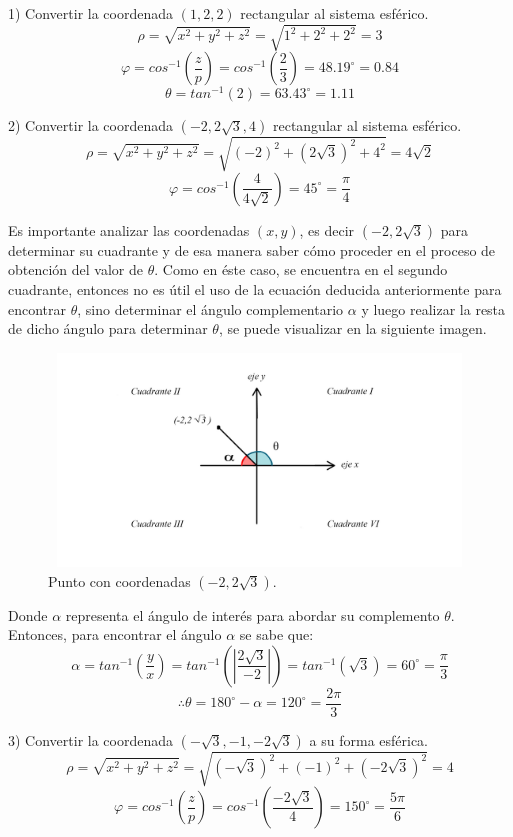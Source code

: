 1) Convertir la coordenada ${(1,2,2)}$ rectangular al sistema esférico.
\[\rho = \sqrt{x^{2}+y^{2}+z^{2}} = \sqrt{1^{2}+2^{2}+2^{2}} = 3\]
\[\varphi = cos^{-1}\left(\frac{z}{p}\right) = cos^{-1}\left(\frac{2}{3}\right) = 48.19^{\circ} = 0.84\]
\[\theta = tan^{-1}(2) = 63.43^{\circ} = 1.11\]

\vspace{4mm}
2) Convertir la coordenada ${(-2,2\sqrt{3},4)}$ rectangular al sistema esférico.
\[\rho = \sqrt{x^{2}+y^{2}+z^{2}} = \sqrt{(-2)^2+(2\sqrt{3})^{2}+4^{2}} = 4 \sqrt{2}\]
\[\varphi = cos^{-1}\left(\frac{4}{4\sqrt{2}}\right) = 45^{\circ} = \frac{\pi}{4}\]

\vspace{4mm}
Es importante analizar las coordenadas ${(x,y)}$, es decir ${(-2,2\sqrt{3})}$ para determinar su cuadrante y de esa manera saber cómo proceder en el proceso de obtención del valor de ${\theta}$. Como en éste caso, se encuentra en el segundo cuadrante, entonces no es útil el uso de la ecuación deducida anteriormente para encontrar ${\theta}$, sino determinar el ángulo complementario ${\alpha}$ y luego realizar la resta de dicho ángulo para determinar ${\theta}$, se puede visualizar en la siguiente imagen.

\begin{figure}[H]
  \centering
  \includegraphics[width=11.17cm, height=5.67cm]{img/graph/segundo_cuadrante.jpg}
  \caption{Punto con coordenadas ${(-2,2\sqrt{3})}$.}
\end{figure}

Donde ${\alpha}$ representa el ángulo de interés para abordar su complemento ${\theta}$. Entonces, para encontrar el ángulo ${\alpha}$ se sabe que:
\[\alpha = tan^{-1}\left(\frac{y}{x}\right) = tan^{-1} \left( \left|\frac{2\sqrt{3}}{-2} \right| \right) = tan^{-1}(\sqrt{3}) = 60^{\circ} = \frac{\pi}{3} \]
\[\therefore \theta = 180^{\circ} - \alpha = 120^{\circ} =\frac{2\pi}{3}\]

\vspace{4mm}
3) Convertir la coordenada ${(-\sqrt{3},-1,-2\sqrt{3})}$ a su forma esférica.
\[\rho = \sqrt{x^{2}+y^{2}+z^{2}} = \sqrt{(-\sqrt{3})^{2}+(-1)^{2}+(-2\sqrt{3})^{2}} = 4\]
\[\varphi = cos^{-1}\left(\frac{z}{p}\right) = cos^{-1}\left(\frac{-2\sqrt{3}}{4}\right) = 150^{\circ} = \frac{5\pi}{6} \]

